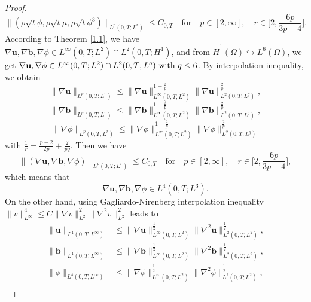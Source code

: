 \documentclass[10pt,a4paper]{amsart}
\begin{document}
\begin{proof}
\begin{equation}
\|(\rho\sqrt{t}\phi, \rho\sqrt{t}\mu,\rho\sqrt{t}\phi^3)\|_{L^p(0,T;L^r)} \leq C_{0,T} \quad \text{for} \quad p \in [2,\infty], \quad r \in \Big[2, \frac{6p}{3p - 4}\Big].\label{eq-12}
\end{equation}
According to Theorem \ref{1.1}, we have $\nabla \mathbf{u}, \nabla \mathbf{b}, \nabla \phi \in L^\infty(0,T;L^2) \cap L^2(0,T;H^1)$, and from $\dot{H}^1(\Omega) \hookrightarrow L^6(\Omega)$, we get $\nabla \mathbf{u}, \nabla \phi \in L^\infty(0,T;L^2) \cap L^2(0,T;L^q)\) with \(q \leq 6$. By interpolation inequality, we obtain
\begin{equation*}
\|\nabla \mathbf{u}\|_{L^p(0,T;L^r)} \leq \|\nabla \mathbf{u}\|_{L^\infty(0,T;L^2)}^{1 - \frac{2}{p}} \|\nabla \mathbf{u}\|_{L^2(0,T;L^q)}^{\frac{2}{p}},
\end{equation*}
\begin{equation*}
\|\nabla \mathbf{b}\|_{L^p(0,T;L^r)} \leq \|\nabla \mathbf{b}\|_{L^\infty(0,T;L^2)}^{1 - \frac{2}{p}} \|\nabla \mathbf{b}\|_{L^2(0,T;L^q)}^{\frac{2}{p}},
\end{equation*}
\begin{equation*}
\|\nabla \phi\|_{L^p(0,T;L^r)} \leq \|\nabla \phi\|_{L^\infty(0,T;L^2)}^{1 - \frac{2}{p}} \|\nabla \phi\|_{L^2(0,T;L^q)}^{\frac{2}{p}}
\end{equation*}
with \(\frac{1}{r} = \frac{p - 2}{2p} + \frac{2}{pq}\). Then we have
\begin{equation*}
\|(\nabla \mathbf{u}, \nabla \mathbf{b}, \nabla \phi)\|_{L^p(0,T;L^r)} \leq C_{0,T} \quad \text{for} \quad p \in [2,\infty], \quad r \in \Big[2, \frac{6p}{3p - 4}\Big],
\end{equation*}
which means that
\begin{equation}
\nabla \mathbf{u}, \nabla \mathbf{b}, \nabla \phi \in L^4(0, T; L^3).\label{eq-15}
\end{equation}
On the other hand, using Gagliardo-Nirenberg interpolation inequality $\|v\|_{L^\infty}^4 \leq C\|\nabla v\|_{L^2}^2 \|\nabla^2 v\|_{L^2}^2$ leads to
\begin{align*}
\|\mathbf{u}\|_{L^4(0,T;L^\infty)} &\leq \|\nabla \mathbf{u}\|_{L^\infty(0,T;L^2)}^{\frac{1}{2}} \|\nabla^2 \mathbf{u}\|_{L^2(0,T;L^2)}^{\frac{1}{2}},\label{eq-16}  \\
\|\mathbf{b}\|_{L^4(0,T;L^\infty)} &\leq \|\nabla \mathbf{b}\|_{L^\infty(0,T;L^2)}^{\frac{1}{2}} \|\nabla^2 \mathbf{b}\|_{L^2(0,T;L^2)}^{\frac{1}{2}},  \\
\|\phi\|_{L^4(0,T;L^\infty)} &\leq \|\nabla \phi\|_{L^\infty(0,T;L^2)}^{\frac{1}{2}} \|\nabla^2 \phi\|_{L^2(0,T;L^2)}^{\frac{1}{2}},\\

\end{align*}
\end{proof}
\end{document}
